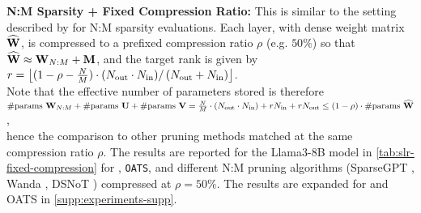 \textbf{N:M Sparsity + Fixed Compression Ratio:}
This is similar to the setting described by \citet{zhang2024oats} for N:M sparsity evaluations. Each layer, with dense weight matrix $\widehat{\mathbf{W}}$, is compressed to a prefixed compression ratio $\rho$ (e.g. $50\%$) so that $\widehat{\mathbf{W}} \approx \mathbf{W}_{N:M} + \mathbf{M}$, and the target rank is given by\\[0.2em] 
$r = \left\lfloor {(1 - \rho - \frac{N}{M}) \cdot(N_{\text{out}}\cdot N_{\text{in}})} / \left({N_{\text{out}} + N_{\text{in}}}\right) \right\rfloor$.\\[0.2em]
Note that the effective number of parameters stored is therefore\\[0.1em]
$\#\text{params } \mathbf{W}_{N:M} + \#\text{params } \mathbf{U} + \#\text{params } \mathbf{V} = \frac{N}{M} \cdot (N_{\text{out}} \cdot N_{\text{in}}) + r N_{\text{in}} + r N_{\text{out}} \leq (1 - \rho) \cdot \#\text{params } \widehat{\mathbf{W}}$,\\[0.5em]
hence the comparison to other pruning methods matched at the same compression ratio $\rho$. The results are reported for the Llama3-8B model in \cref{tab:slr-fixed-compression} for \ourframework, \texttt{OATS}, and different N:M pruning algorithms (SparseGPT \cite{frantar2023sparsegpt}, Wanda \cite{sun2023simple}, DSNoT \cite{zhang2023dynamic}) compressed at $\rho = 50\%$. The results are expanded for \ourframework and OATS in \cref{supp:experiments-supp}. 


